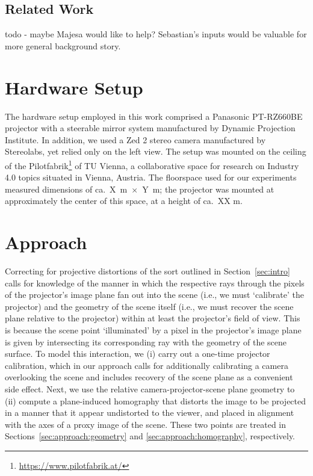 \documentclass[review]{elsarticle}
\begin{document}
\subsection{Related Work}

todo - maybe Majesa would like to help? Sebastian's inputs would be valuable for more general background story.

\section{Hardware Setup}

The hardware setup employed in this work comprised a Panasonic PT-RZ660BE projector with a steerable mirror system manufactured by Dynamic Projection Institute. In addition, we used a Zed 2 stereo camera manufactured by Stereolabs, yet relied only on the left view. The setup was mounted on the ceiling of the Pilotfabrik\footnote{\url{https://www.pilotfabrik.at/}} of TU Vienna, a collaborative space for research on Industry 4.0 topics situated in Vienna, Austria. The floorspace used for our experiments measured dimensions of ca.\ X~m~$\times$~Y~m; the projector was mounted at approximately the center of this space, at a height of ca.\ XX m. 

\section{Approach}

Correcting for projective distortions of the sort outlined in Section~\ref{sec:intro} calls for knowledge of the manner in which the respective rays through the pixels of the projector's image plane fan out into the scene (i.e., we must `calibrate' the projector) and the geometry of the scene itself (i.e., we must recover the scene plane relative to the projector) within at least the projector's field of view. This is because the scene point `illuminated' by a pixel in the projector's image plane is given by intersecting its corresponding ray with the geometry of the scene surface. To model this interaction, we (i) carry out a one-time projector calibration, which in our approach calls for additionally calibrating a camera overlooking the scene and includes recovery of the scene plane as a convenient side effect. Next, we use the relative camera-projector-scene plane geometry to (ii) compute a plane-induced homography that distorts the image to be projected in a manner that it appear undistorted to the viewer, and placed in alignment with the axes of a proxy image of the scene. These two points are treated in Sections~\ref{sec:approach:geometry} and \ref{sec:approach:homography}, respectively.
\end{document}
